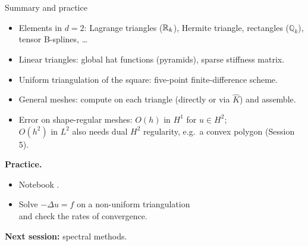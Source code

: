 \begin{frame}{Summary and practice}
    \begin{itemize}
        \item Elements in $d=2$: Lagrange triangles (${\mathbb R}_k$), Hermite triangle, rectangles ($\mathbb Q_k$), tensor B-splines, \dots
        \item Linear triangles: global hat functions (pyramids), sparse stiffness matrix.
        \item Uniform triangulation of the square: five-point finite-difference scheme.
        \item General meshes: compute on each triangle (directly or via $\widehat K$) and assemble.
        \item Error on shape-regular meshes: $O(h)$ in $H^1$ for $u\in H^2$;\\ $O(h^2)$ in $L^2$ also needs dual $H^2$ regularity, e.g.\ a convex polygon (Session 5).
    \end{itemize}
    \bigskip
    \textbf{Practice.}
    \begin{itemize}
        \item Notebook .
        \item Solve $-\Delta u = f$ on a non-uniform triangulation\\ and check the rates of convergence.
    \end{itemize}
    \bigskip
    \textbf{Next session:} spectral methods.
\end{frame}
